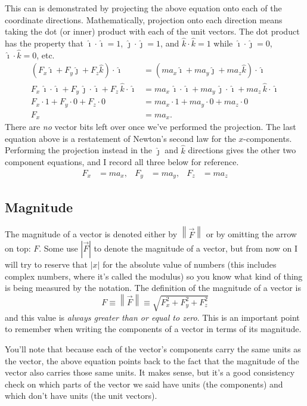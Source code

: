 \documentclass[10pt,letterpaper,twoside]{article}
\begin{document}
This can is demonstrated by projecting the above equation onto each of the coordinate directions.
Mathematically, projection onto each direction means taking the dot (or inner) product with each of the unit vectors.
The dot product has the property that $\hat\imath\cdot\hat\imath=1$, $\hat\jmath\cdot\hat\jmath=1$, and $\hat k\cdot\hat k=1$ while $\hat\imath\cdot\hat\jmath=0$, $\hat\imath\cdot\hat k=0$, etc.
\begin{align*}
  \left(F_x\hat\imath + F_y\hat\jmath + F_z\hat k\right)\cdot\hat\imath &= \left(ma_x\hat\imath + ma_y\hat\jmath + ma_z\hat k\right)\cdot\hat\imath \\
  F_x\,\hat\imath\cdot\hat\imath + F_y\,\hat\jmath\cdot\hat\imath + F_z\,\hat k\cdot\hat\imath &= ma_x\,\hat\imath\cdot\hat\imath + ma_y\,\hat\jmath\cdot\hat\imath + ma_z\,\hat k\cdot\hat\imath \\
  F_x\cdot1 + F_y\cdot0 + F_z\cdot0 &= ma_x\cdot1 + ma_y\cdot0 + ma_z\cdot0 \\
  F_x &= ma_x.
\end{align*}
There are \textit{no} vector bits left over once we've performed the projection.
The last equation above is a restatement of Newton's second law for the $x$-components.
Performing the projection instead in the $\hat\jmath$ and $\hat k$ directions gives the other two component equations, and I record all three below for reference.
\begin{align*}
  F_x &= ma_x,&  F_y &= ma_y,& F_z &= ma_z
\end{align*}

\subsection{Magnitude}
The magnitude of a vector is denoted either by $\left\lVert \vec F\right\rVert $ or by omitting the arrow on top: $F$.
Some use $\left|\vec F\right|$ to denote the magnitude of a vector, but from now on I will try to reserve that $\left| x \right|$ for the absolute value of numbers (this includes complex numbers, where it's called the modulus) so you know what kind of thing is being measured by the notation.
The definition of the magnitude of a vector is
$$F\equiv\left\lVert \vec F\right\rVert  \equiv \sqrt{F_x^2 + F_y^2 + F_z^2}$$
and this value is \textit{always greater than or equal to zero}. This is an important point to remember when writing the components of a vector in terms of its magnitude.

You'll note that because each of the vector's components carry the same units as the vector, the above equation points back to the fact that the magnitude of the vector also carries those same units.
It makes sense, but it's a good consistency check on which parts of the vector we said have units (the components) and which don't have units (the unit vectors).
\end{document}
